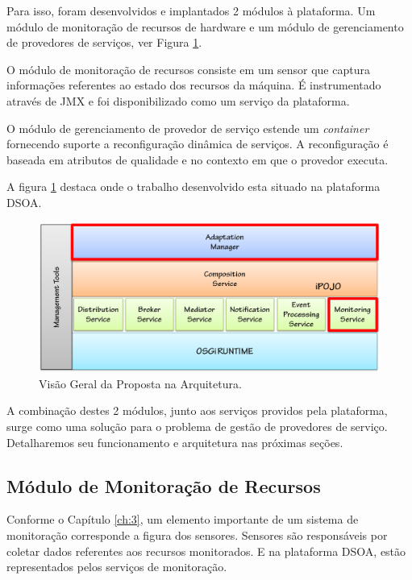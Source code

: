 Para isso, foram desenvolvidos e implantados 2 módulos à plataforma. Um módulo de monitoração de recursos de hardware e um módulo de gerenciamento de provedores de serviços, ver Figura \ref{fig:proposal}.

O módulo de monitoração de recursos consiste em um sensor que captura informações referentes ao estado dos recursos da máquina. É instrumentado através de JMX e foi disponibilizado como um serviço da plataforma. 

O módulo de gerenciamento de provedor de serviço estende um \textit{container} fornecendo suporte a reconfiguração dinâmica de serviços. A reconfiguração é baseada em atributos de qualidade e no contexto em que o provedor executa.

A figura \ref{fig:proposal} destaca onde o trabalho desenvolvido esta situado na plataforma DSOA.

\begin{figure}[htp]
\centering
\includegraphics[width=13cm]{chapters/chapter4/dsoa-provider-manager.png}
\caption[Visão Geral da Proposta na Arquitetura]{Visão Geral da Proposta na Arquitetura.}
\label{fig:proposal}
\end{figure}

A combinação destes 2 módulos, junto aos serviços providos pela plataforma, surge como uma solução para o problema de gestão de provedores de serviço. Detalharemos seu funcionamento e arquitetura nas próximas seções.


\subsection{Módulo de Monitoração de Recursos}

Conforme o Capítulo \ref{ch:3}, um elemento importante de um sistema de monitoração corresponde a figura dos sensores. Sensores são responsáveis por coletar dados referentes aos recursos monitorados. E na plataforma DSOA, estão representados pelos serviços de monitoração. 

